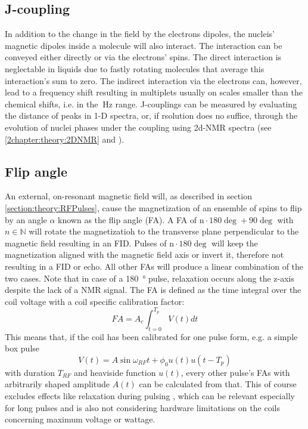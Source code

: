         \subsection{J-coupling}
        In addition to the change in the field by the electrons dipoles, the nucleis' magnetic dipoles inside a molecule will also interact. The interaction can be conveyed either directly or via the electrons' spins. The direct interaction is neglectable in liquids due to fastly rotating molecules that average this interaction's sum to zero. The indirect interaction via the electrons can, however, lead to a frequency shift resulting in multiplets usually on scales smaller than the chemical shifts, i.e. in the $\SI{}{\hertz}$ range.
        J-couplings can be measured by evaluating the distance of peaks in 1-D spectra, or, if rsolution does no suffice, through the evolution of nuclei phases under the coupling using 2d-NMR spectra (see \ref{2chapter:theory:2DNMR} and \cite{ottiger_measurement_1998}).
        \subsection{Flip angle}
        An external, on-resonant magnetic field will, as described in section \ref{section:theory:RFPulses}, cause the magnetization of an ensemble of spins to flip by an angle $\alpha$ known as the flip angle (FA). A FA of $\mathrm n\cdot 180 \deg + 90 \deg$ with $n \in \mathbb{N}$ will rotate the magnetizatioh to the transverse plane perpendicular to the magnetic field resulting in an FID. Pulses of $\mathrm n\cdot 180 \deg$ will keep the magnetization aligned with the magnetic field axis or invert it, therefore not resulting in a FID or echo. All other FAs will produce a linear combination of the two cases. Note that in case of a \SI{180}{\degree} pulse, relaxation occurs along the z-axis despite the lack of a NMR signal. The FA is defined as the time integral over the coil voltage with a coil specific calibration factor:
            \begin{equation}
                FA = A_c \int_{t=0}^{T_p}{V(t)dt}
            \end{equation}
            This means that, if the coil has been calibrated for one pulse form, e.g. a simple box pulse 
            \begin{equation}
                V(t) = A\sin{\omega_{RF} t + \phi_0} u(t)u(t-T_p)
            \end{equation}
            with duration $T_{RF}$ and heaviside function $u(t)$, every other pulse's FAs with arbitrarily shaped amplitude $A(t)$ can be calculated from that. This of course excludes effects like relaxation during pulsing \cite{wang_factors_2006}, which can be relevant especially for long pulses and is also not considering hardware limitations on the coils concerning maximum voltage or wattage.
